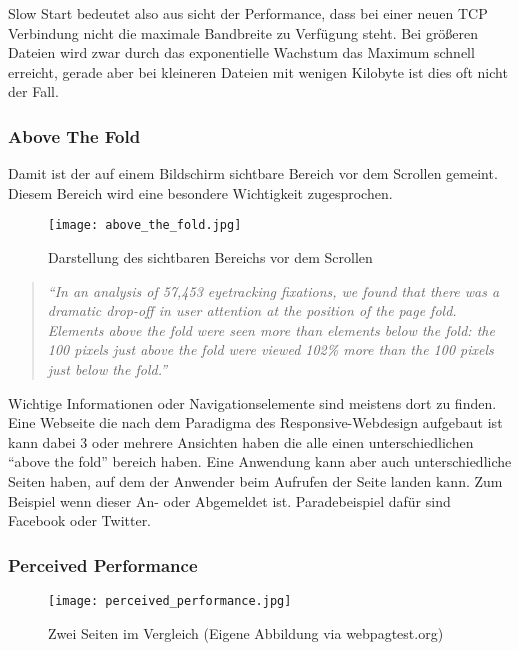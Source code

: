 			Slow Start bedeutet also aus sicht der Performance, dass bei einer neuen TCP Verbindung nicht die maximale Bandbreite zu Verfügung steht. Bei größeren Dateien wird zwar durch das exponentielle Wachstum das Maximum schnell erreicht, gerade aber bei kleineren Dateien mit wenigen Kilobyte ist dies oft nicht der Fall.

		
		\subsubsection{Above The Fold} %
		\label{ssub:above_the_fold}
			Damit ist der auf einem Bildschirm sichtbare Bereich vor dem Scrollen gemeint. Diesem Bereich wird eine besondere Wichtigkeit zugesprochen.
			\begin{figure}[htbp]
				\begin{center}
					\texttt{[image: above\_the\_fold.jpg]}
					\caption{Darstellung des sichtbaren Bereichs vor dem Scrollen}
					\label{fig:above_the_fold}
				\end{center}
			\end{figure}

			\begin{quote}
				 \textit{"`In an analysis of 57,453 eyetracking fixations, we found that there was a dramatic drop-off in user attention at the position of the page fold. Elements above the fold were seen more than elements below the fold: the 100 pixels just above the fold were viewed 102\% more than the 100 pixels just below the fold."'} \autocite{nng15}
			\end{quote}

			Wichtige Informationen oder Navigationselemente sind meistens dort zu finden. Eine Webseite die nach dem Paradigma des Responsive-Webdesign aufgebaut ist kann dabei 3 oder mehrere Ansichten haben die alle einen unterschiedlichen "`above the fold"' bereich haben. Eine Anwendung kann aber auch unterschiedliche Seiten haben, auf dem der Anwender beim Aufrufen der Seite landen kann. Zum Beispiel wenn dieser An- oder Abgemeldet ist. Paradebeispiel dafür sind Facebook oder Twitter.

		\subsubsection{Perceived Performance} %
		\label{sub:perceived_performance}
			\begin{figure}[htbp]
				\begin{center}
					\texttt{[image: perceived\_performance.jpg]}
					\caption{Zwei Seiten im Vergleich (Eigene Abbildung via webpagtest.org)}
					\label{fig:perceived_performance}
				\end{center}
			\end{figure}

